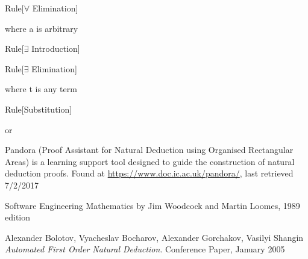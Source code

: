 \begin{namedthm}{Rule}[$\forall$ Elimination]

\begin{bprooftree}
\end{bprooftree}\qquad where a is arbitrary \qquad

\end{namedthm}


\begin{namedthm}{Rule}[$\exists$ Introduction]

\begin{bprooftree}
\end{bprooftree}\qquad

\end{namedthm}

\begin{namedthm}{Rule}[$\exists$ Elimination]

\begin{bprooftree}
\end{bprooftree}\qquad where t is any term

\end{namedthm}

\begin{namedthm}{Rule}[Substitution]

\begin{bprooftree}
\end{bprooftree}\qquad or \qquad
\begin{bprooftree}
\end{bprooftree}

\end{namedthm}

\pagebreak

\begin{thebibliography}{9}

Pandora (Proof Assistant for Natural Deduction using Organised Rectangular Areas) is a learning support tool designed to guide the construction of natural deduction proofs. Found at \url{https://www.doc.ic.ac.uk/pandora/}, last retrieved 7/2/2017

Software Engineering Mathematics by Jim Woodcock and Martin Loomes, 1989 edition

Alexander Bolotov, Vyacheslav Bocharov, Alexander Gorchakov, Vasilyi Shangin \textit{Automated First Order Natural Deduction}. Conference Paper, January 2005


\end{thebibliography}




